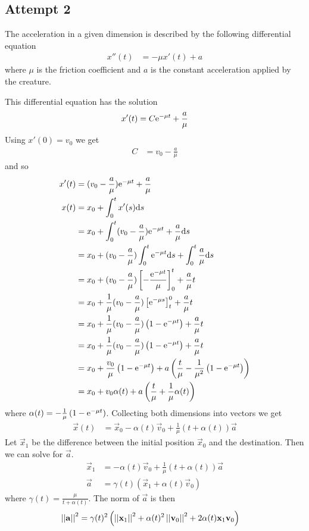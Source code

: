 \documentclass[main.tex]{subfiles}
\begin{document}
\subsection*{Attempt 2}

The acceleration in a given dimension is described by the following differential equation
\begin{align*}
    x''(t) &= -\mu x'(t)+a
\end{align*}
where $\mu$ is the friction coefficient and $a$ is the constant acceleration applied by the creature.

This differential equation has the solution
\begin{align*}
    x'(t)=C\mathrm{e}^{-\mu t}+\frac{a}{\mu}
\end{align*}
Using $x'(0)=v_0$ we get
\begin{align*}
    C &= v_0-\frac{a}{\mu}
\end{align*}
and so
\begin{align*}
    x'(t) &= (v_0-\frac{a}{\mu})\mathrm{e}^{-\mu t}+\frac{a}{\mu}\\
    x(t)&=x_0+\int_0^tx'(s)\mathrm{d} s\\
    &=x_0+\int_0^t(v_0-\frac{a}{\mu})\mathrm{e}^{-\mu t}+\frac{a}{\mu}\mathrm{d} s\\
    &=x_0+(v_0-\frac{a}{\mu})\int_0^t\mathrm{e}^{-\mu t}\mathrm{d} s+\int_0^t\frac{a}{\mu}\mathrm{d} s\\
    &=x_0+(v_0-\frac{a}{\mu})\left[-\frac{\mathrm{e}^{-\mu t}}{\mu}\right]_0^t+\frac{a}{\mu}t\\
    &=x_0+\frac{1}{\mu}(v_0-\frac{a}{\mu})\left[\mathrm{e}^{-\mu s}\right]_t^0+\frac{a}{\mu}t\\
    &=x_0+\frac{1}{\mu}(v_0-\frac{a}{\mu})\left(1-\mathrm{e}^{-\mu t}\right)+\frac{a}{\mu}t\\
    &=x_0+\frac{1}{\mu}(v_0-\frac{a}{\mu})\left(1-\mathrm{e}^{-\mu t}\right)+\frac{a}{\mu}t\\
    &=x_0+\frac{v_0}{\mu}\left(1-\mathrm{e}^{-\mu t}\right)+a\left(\frac{t}{\mu}-\frac{1}{\mu^2}\left(1-\mathrm{e}^{-\mu t}\right)\right)\\
    &=x_0+v_0\alpha(t)+a\left(\frac{t}{\mu}+\frac{1}{\mu}\alpha(t)\right)
\end{align*}
where $\alpha(t)=-\frac{1}{\mu}\left(1-\mathrm{e}^{-\mu t}\right)$.
Collecting both dimensions into vectors we get
\begin{align*}
    \vec x(t)&=\vec x_0-\alpha(t)\vec v_0+\frac{1}{\mu}\left(t+\alpha(t)\right)\vec a
\end{align*}
Let $\vec x_1$ be the difference between the initial position $\vec x_0$ and the destination.
Then we can solve for $\vec a$.
\begin{align*}
    \vec x_1&=-\alpha(t)\vec v_0+\frac{1}{\mu}\left(t+\alpha(t)\right)\vec a\\
    \vec a&=\gamma(t)\left(\vec x_1+\alpha(t)\vec v_0\right)
\end{align*}
where $\gamma(t)=\frac{\mu}{t+\alpha(t)}$.
The norm of $\vec a$ is then
\begin{align*}
    \left\lvert\left\lvert\mathbf{a}\right\lvert\right\lvert^2&=\gamma(t)^2\left(\left\lvert\left\lvert\mathbf{x}_1\right\lvert\right\lvert^2+\alpha(t)^2\left\lvert\left\lvert\mathbf{v}_0\right\lvert\right\lvert^2+2\alpha(t)\mathbf{x}_1\mathbf{v}_0\right)
\end{align*}
\end{document}

